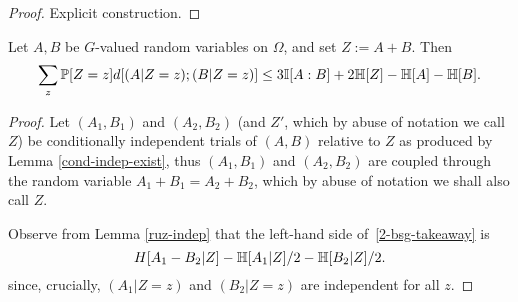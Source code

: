 \begin{proof} Explicit construction.
\end{proof}


\begin{lemma}\label{lem-bsg}
  Let $A,B$ be $G$-valued random variables on $\Omega$, and set $Z := A+B$.
Then
\begin{equation}\label{2-bsg-takeaway} \sum_{z}  \mathbb{P}[Z=z] d[(A | Z = z); (B | Z = z)] \leq 3  \mathbb{I}[A:B] + 2 \mathbb{H}[Z] - \mathbb{H}[A] - \mathbb{H}[B]. \end{equation}
\end{lemma}

\begin{proof}
Let $(A_1, B_1)$ and $(A_2, B_2)$ (and $Z'$, which by abuse of notation we call $Z$) be conditionally independent trials of $(A,B)$ relative to $Z$ as produced by Lemma \ref{cond-indep-exist}, thus $(A_1,B_1)$ and $(A_2,B_2)$ are coupled through the random variable $A_1 + B_1 = A_2 + B_2$, which by abuse of notation we shall also call $Z$.

Observe from Lemma \ref{ruz-indep} that the left-hand side of~\eqref{2-bsg-takeaway} is
\begin{equation}\label{lhs-to-bound}
H[A_1 - B_2| Z] - \mathbb{H}[A_1 | Z]/2 - \mathbb{H}[B_2 | Z]/2.
\end{equation}
since, crucially, $(A_1 | Z=z)$ and $(B_2 | Z=z)$ are independent for all $z$.


\end{proof}
